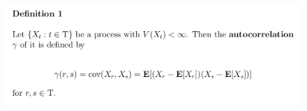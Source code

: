 \documentclass[c, dvipsnames, 8pt]{beamer}
\begin{document}
\begin{frame}[shrink=5]


\frametitle{\insertsection} 
\begin{figure}
	\centering
	\includegraphics[width=1\linewidth]{screenshot003}
	\label{fig:screenshot001}
\end{figure}





\end{frame}
\end{document}
